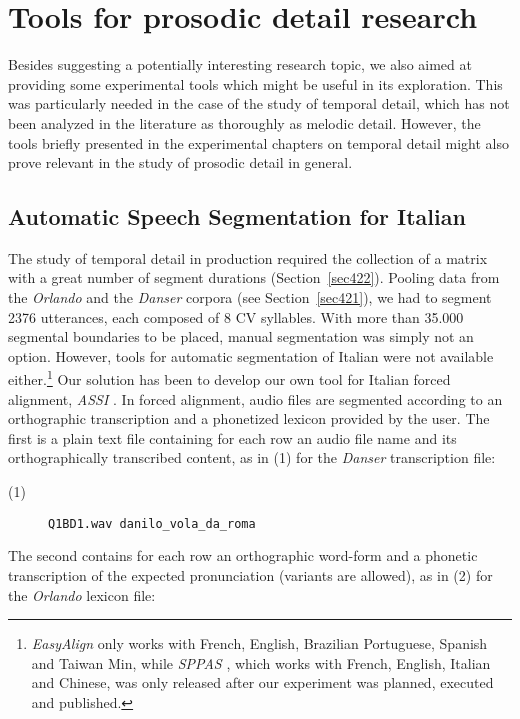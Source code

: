 \section{Tools for prosodic detail research}\label{sec62}
Besides suggesting a potentially interesting research topic, we also aimed at providing some experimental tools which might be useful in its exploration. This was particularly needed in the case of the study of temporal detail, which has not been analyzed in the literature as thoroughly as melodic detail. However, the tools briefly presented in the experimental chapters on temporal detail might also prove relevant in the study of prosodic detail in general. 

\subsection{Automatic Speech Segmentation for Italian}\label{sec621}
The study of temporal detail in production required the collection of a matrix with a great number of segment durations (Section~\ref{sec422}). Pooling data from the \textit{Orlando} and the \textit{Danser} corpora (see Section~\ref{sec421}), we had to segment 2376 utterances, each composed of 8 CV syllables. With more than 35.000 segmental boundaries to be placed, manual segmentation was simply not an option. However, tools for automatic segmentation of Italian were not available either.\footnote{\textit{EasyAlign} \citep{goldman2011easyalign} only works with French, English, Brazilian Portuguese, Spanish and Taiwan Min, while \textit{SPPAS} \citep{bigi2012speech}, which works with French, English, Italian and Chinese, was only released after our experiment was planned, executed and published.} Our solution has been to develop our own tool for Italian forced alignment, \textit{ASSI} \citep{cangemi2011automatic}. In forced alignment, audio files are segmented according to an orthographic transcription and a phonetized lexicon provided by the user. The first is a plain text file containing for each row an audio file name and its orthographically transcribed content, as in (1) for the \textit{Danser} transcription file:

\begin{description}
   \item[(1)] {\tt Q1BD1.wav danilo\_vola\_da\_roma}
\end{description}\label{ex61}

\noindent The second contains for each row an orthographic word-form and a phonetic transcription of the expected pronunciation (variants are allowed), as in (2) for the \textit{Orlando} lexicon file: 

